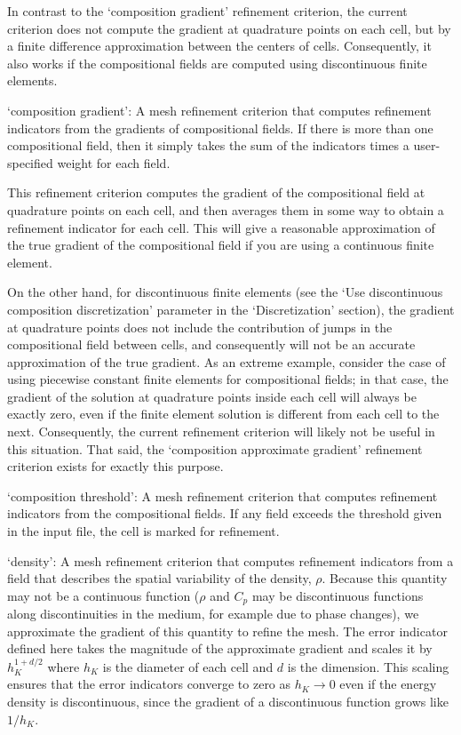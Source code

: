 \begin{itemize}
In contrast to the `composition gradient' refinement criterion, the current criterion does not compute the gradient at quadrature points on each cell, but by a finite difference approximation between the centers of cells. Consequently, it also works if the compositional fields are computed using discontinuous finite elements.

`composition gradient': A mesh refinement criterion that computes refinement indicators from the gradients of compositional fields. If there is more than one compositional field, then it simply takes the sum of the indicators times a user-specified weight for each field.

This refinement criterion computes the gradient of the compositional field at quadrature points on each cell, and then averages them in some way to obtain a refinement indicator for each cell. This will give a reasonable approximation of the true gradient of the compositional field if you are using a continuous finite element.

On the other hand, for discontinuous finite elements (see the `Use discontinuous composition discretization' parameter in the `Discretization' section), the gradient at quadrature points does not include the contribution of jumps in the compositional field between cells, and consequently will not be an accurate approximation of the true gradient. As an extreme example, consider the case of using piecewise constant finite elements for compositional fields; in that case, the gradient of the solution at quadrature points inside each cell will always be exactly zero, even if the finite element solution is different from each cell to the next. Consequently, the current refinement criterion will likely not be useful in this situation. That said, the `composition approximate gradient' refinement criterion exists for exactly this purpose.

`composition threshold': A mesh refinement criterion that computes refinement indicators from the compositional fields. If any field exceeds the threshold given in the input file, the cell is marked for refinement.

`density': A mesh refinement criterion that computes refinement indicators from a field that describes the spatial variability of the density, $\rho$. Because this quantity may not be a continuous function ($\rho$ and $C_p$ may be discontinuous functions along discontinuities in the medium, for example due to phase changes), we approximate the gradient of this quantity to refine the mesh. The error indicator defined here takes the magnitude of the approximate gradient and scales it by $h_K^{1+d/2}$ where $h_K$ is the diameter of each cell and $d$ is the dimension. This scaling ensures that the error indicators converge to zero as $h_K\rightarrow 0$ even if the energy density is discontinuous, since the gradient of a discontinuous function grows like $1/h_K$.


\end{itemize}
